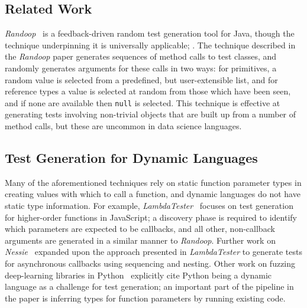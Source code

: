 \documentclass[sigplan,anonymous,review]{acmart}
\begin{document}
\subsection{Related Work}


\emph{Randoop}~\cite{pacheco2007randoop} is a feedback-driven random test generation tool for Java, though the technique underpinning it is universally applicable; .
The technique described in the \emph{Randoop} paper generates sequences of method calls to test classes, and randomly generates arguments for these calls in two ways: for primitives, a random value is selected from a predefined, but user-extensible list, and for reference types a value is selected at random from those which have been seen, and if none are available then {\tt null} is selected.
This technique is effective at generating tests involving non-trivial objects that are built up from a number of method calls, but these are uncommon in data science languages.


\subsection{Test Generation for Dynamic Languages}

Many of the aforementioned techniques rely on static function parameter types in creating values with which to call a function, and dynamic languages do not have static type information.
For example, \emph{LambdaTester}~\cite{lambdatester} focuses on test generation for higher-order functions in JavaScript; a discovery phase is required to identify which parameters are expected to be callbacks, and all other, non-callback arguments are generated in a similar manner to \emph{Randoop}.
Further work on \emph{Nessie}~\cite{arteca2022nessie} expanded upon the approach presented in \emph{LambdaTester} to generate tests for asynchronous callbacks using sequencing and nesting.
Other work on fuzzing deep-learning libraries in Python~\cite{wei2022free} explicitly cite Python being a dynamic language as a challenge for test generation; an important part of the pipeline in the paper is inferring types for function parameters by running existing code.

\end{document}
